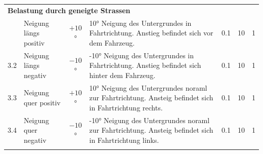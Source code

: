 \begin{landscape}
\begin{tabularx}{\linewidth}{llcXccc}
    \multicolumn{7}{l}{\textbf{Belastung durch geneigte Strassen}}\\
    \thickhline
    3.1	& Neigung längs positiv & $+10$° & 10° Neigung des Untergrundes in Fahrtrichtung. Anstieg befindet sich vor dem Fahrzeug. & 0.1 & 10 & 1\\
    3.2	& Neigung längs negativ & $-10$° & -10° Neigung des Untergrundes in Fahrtrichtung. Anstieg befindet sich hinter dem Fahrzeug. & 0.1 & 10 & 1\\
    3.3	& Neigung quer positiv  &$+10$° & 10° Neigung des Untergrundes noraml zur Fahrtrichtung. Ansteig befindet sich in Fahrtrichtung rechts. & 0.1 & 10 & 1\\
    3.4	& Neigung quer negativ  &$-10$° & -10° Neigung des Untergrundes noraml zur Fahrtrichtung. Ansteig befindet sich in Fahrtrichtung links. & 0.1 & 10 & 1\\

    \thickhline
  \end{tabularx}
  \label{Lastenheft A}
\end{landscape}

